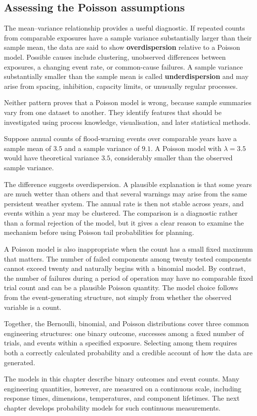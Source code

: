 \subsection{Assessing the Poisson assumptions}

The mean--variance relationship provides a useful diagnostic. If repeated counts from comparable exposures have a sample variance substantially larger than their sample mean, the data are said to show \textbf{overdispersion} relative to a Poisson model. Possible causes include clustering, unobserved differences between exposures, a changing event rate, or common-cause failures. A sample variance substantially smaller than the sample mean is called \textbf{underdispersion} and may arise from spacing, inhibition, capacity limits, or unusually regular processes.

Neither pattern proves that a Poisson model is wrong, because sample summaries vary from one dataset to another. They identify features that should be investigated using process knowledge, visualisation, and later statistical methods.

\begin{example}\par
Suppose annual counts of flood-warning events over comparable years have a sample mean of $3.5$ and a sample variance of $9.1$. A Poisson model with $\lambda=3.5$ would have theoretical variance $3.5$, considerably smaller than the observed sample variance.

The difference suggests overdispersion. A plausible explanation is that some years are much wetter than others and that several warnings may arise from the same persistent weather system. The annual rate is then not stable across years, and events within a year may be clustered. The comparison is a diagnostic rather than a formal rejection of the model, but it gives a clear reason to examine the mechanism before using Poisson tail probabilities for planning.
\end{example}

A Poisson model is also inappropriate when the count has a small fixed maximum that matters. The number of failed components among twenty tested components cannot exceed twenty and naturally begins with a binomial model. By contrast, the number of failures during a period of operation may have no comparable fixed trial count and can be a plausible Poisson quantity. The model choice follows from the event-generating structure, not simply from whether the observed variable is a count.

Together, the Bernoulli, binomial, and Poisson distributions cover three common engineering structures: one binary outcome, successes among a fixed number of trials, and events within a specified exposure. Selecting among them requires both a correctly calculated probability and a credible account of how the data are generated.

The models in this chapter describe binary outcomes and event counts. Many engineering quantities, however, are measured on a continuous scale, including response times, dimensions, temperatures, and component lifetimes. The next chapter develops probability models for such continuous measurements.
